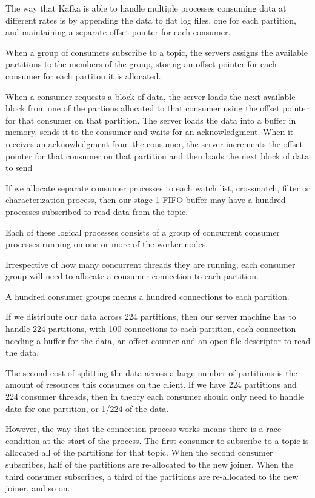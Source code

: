 \documentclass{article}
\newcommand{\crossmatch} {crossmatch\xspace}
\begin{document}
The way that Kafka is able to handle multiple processes consuming data at different rates is by appending the data to flat log files, one for each partition, and maintaining a separate offset pointer for each consumer.

When a group of consumers subscribe to a topic, the servers assigns the available partitions to the members of the group, storing an offset pointer for each consumer for each partiton it is allocated.

When a consumer requests a block of data, the server loads the next available block from one of the partions allocated to that consumer using the offset pointer for that consumer on that partition.
The server loads the data into a buffer in memory, sends it to the consumer and waits for an acknowledgment.
When it receives an acknowledgment from the consumer, the server increments the offset pointer for that consumer on that partition and then loads the next block of data to send

If we allocate separate consumer processes to each watch list, \crossmatch, filter or characterization process, then our stage 1 FIFO buffer may have a hundred processes subscribed to read data from the topic.

Each of these logical processes consists of a group of concurrent consumer processes running on one or more of the worker nodes.

Irrespective of how many concurrent threads they are running, each consumer group will need to allocate
a consumer connection to each partition.

A hundred consumer groups means a hundred connections to each partition.

If we distribute our data across 224 partitions, then our server machine has to handle 224 partitions, with 100 connections to each partition, each connection needing a buffer for the data, an offset counter and an open file descriptor to read the data.

The second cost of splitting the data across a large number of partitions is the amount of resources this consumes on the client.
If we have 224 partitions and 224 consumer threads, then in theory each consumer should only need to handle data for one partition, or 1/224 of the data.

However, the way that the connection process works means there is a race condition at the start of the process.
The first consumer to subscribe to a topic is allocated all of the partitions for that topic.
When the second consumer subscribes, half of the partitions are re-allocated to the new joiner.
When the third consumer subscribes, a third of the partitions are re-allocated to the new joiner, and so on.
\end{document}
